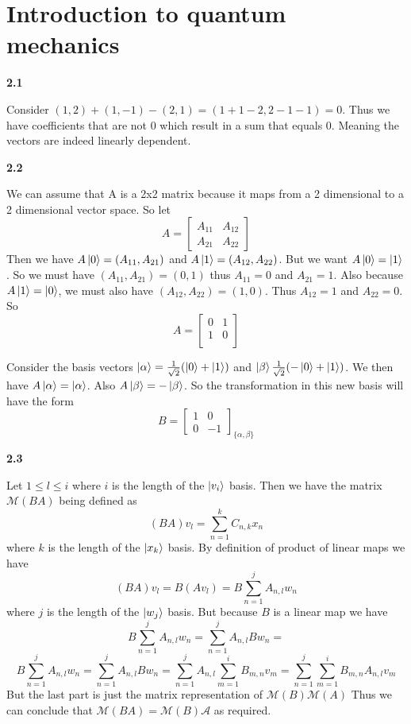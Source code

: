 \section{Introduction to quantum mechanics}

\textbf{2.1}

Consider $(1,2) + (1,-1) - (2,1) = (1+1-2, 2-1 -1) = 0$. Thus we have coefficients that are not 0 which result in a sum that equals 0. Meaning the vectors are indeed linearly dependent.

\textbf{2.2}

We can assume that A is a 2x2 matrix because it maps from a 2 dimensional to a 2 dimensional vector space. So let 
\[
A=
\begin{bmatrix}
   A_{11} & A_{12}\\
   A_{21} & A_{22}
\end{bmatrix}
\]
Then we have $ A\ket{0} =(A_{11}, A_{21}) $ and $A\ket{1} = (A_{12},A_{22})$. But we want $A\ket{0} = \ket{1}$. So we must have $(A_{11}, A_{21}) = (0,1)$ thus $A_{11} = 0$ and $A_{21} = 1$. Also because $ A\ket{1} = \ket{0}$, we must also have $(A_{12},A_{22}) = (1,0)$. Thus $A_{12} = 1$ and $A_{22} =0$. So
\[A =
\begin{bmatrix}
    0 & 1 \\
    1 & 0 \\
\end{bmatrix}
\]

Consider the basis vectors $\ket{\alpha}=\frac{1}{\sqrt{2}}(\ket{0} + \ket {1})$ and $\ket{\beta}\frac{1}{\sqrt{2}}(-\ket{0} + \ket{1})$. We then have $A\ket{\alpha} =\ket{\alpha}$. Also $A\ket{\beta} = -\ket{\beta}$. So the transformation in this new basis will have the form 
\[
B=
\begin{bmatrix}
    1 & 0\\
    0 & -1
\end{bmatrix}_{\{\alpha,\beta\}}
\]

\textbf{2.3}

Let $1\leq l \leq  i$ where $i$ is the length of the $\ket{v_i}$ basis. Then we have the matrix $\mathcal{M}(BA)$ being defined as \[(BA)v_l = \sum_{n=1}^{k} C_{n, k}x_n\] where $k$ is the length of the $\ket{x_k}$ basis. By definition of product of linear maps we have \[(BA)v_l = B(Av_l) = B\sum_{n=1}^{j}A_{n,l}w_n\] where $j$ is the length of the $ \ket{w_j}$ basis. But because $B$ is a linear map we have 
\[B\sum_{n=1}^{j}A_{n,l}w_n =\sum_{n=1}^{j}A_{n,l}Bw_n =  \]
\[B\sum_{n=1}^{j}A_{n,l}w_n =\sum_{n=1}^{j}A_{n,l}Bw_n = \sum_{n=1}^{j}A_{n,l}\sum_{m=1}^{i}B_{m,n}v_m = \sum_{n=1}^{j}\sum_{m=1}^{i}B_{m,n}A_{n,l}v_m \]
But the last part is just the matrix representation of $\mathcal{M}(B)\mathcal{M}(A)$ Thus we can conclude that $\mathcal{M}(BA) = \mathcal{M}(B)\mathcal{A}$ as required.

